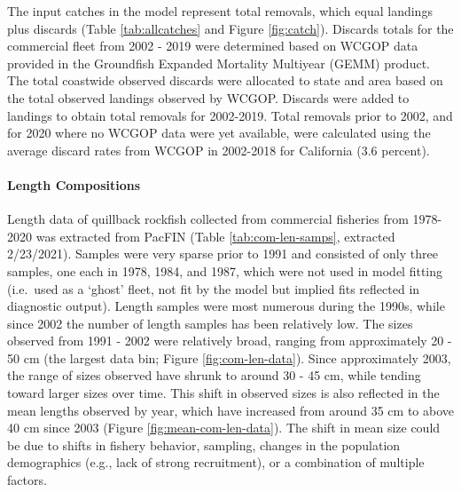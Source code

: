 \documentclass[11pt,
  english,
  letterpaper,
]{article}
\begin{document}
\leavevmode\tagmcend\tagstructend\par


The input catches in the model represent total removals, which equal landings plus discards (Table \ref{tab:allcatches} and Figure \ref{fig:catch}). Discards totals for the commercial fleet from 2002 - 2019 were determined based on WCGOP data provided in the Groundfish Expanded Mortality Multiyear (GEMM) product. The total coastwide observed discards were allocated to state and area based on the total observed landings observed by WCGOP. Discards were added to landings to obtain total removals for 2002-2019. Total removals prior to 2002, and for 2020 where no WCGOP data were yet available, were calculated using the average discard rates from WCGOP in 2002-2018 for California (3.6 percent).

\leavevmode\tagmcend\tagstructend\par


\hypertarget{length-compositions}{%
\paragraph{Length Compositions}\label{length-compositions}}

\leavevmode\tagmcend\tagstructend


Length data of quillback rockfish collected from commercial fisheries from 1978-2020 was extracted from PacFIN (Table \ref{tab:com-len-samps}, extracted 2/23/2021). Samples were very sparse prior to 1991 and consisted of only three samples, one each in 1978, 1984, and 1987, which were not used in model fitting (i.e.~used as a `ghost' fleet, not fit by the model but implied fits reflected in diagnostic output). Length samples were most numerous during the 1990s, while since 2002 the number of length samples has been relatively low. The sizes observed from 1991 - 2002 were relatively broad, ranging from approximately 20 - 50 cm (the largest data bin; Figure \ref{fig:com-len-data}). Since approximately 2003, the range of sizes observed have shrunk to around 30 - 45 cm, while tending toward larger sizes over time. This shift in observed sizes is also reflected in the mean lengths observed by year, which have increased from around 35 cm to above 40 cm since 2003 (Figure \ref{fig:mean-com-len-data}). The shift in mean size could be due to shifts in fishery behavior, sampling, changes in the population demographics (e.g., lack of strong recruitment), or a combination of multiple factors.
\end{document}
